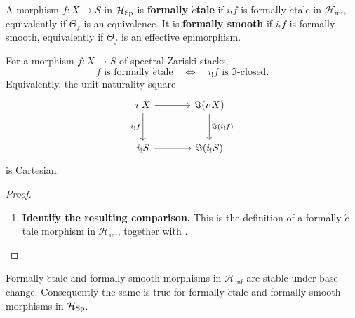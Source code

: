 \begin{definition}
\label{def:formal-smooth-etale}
A morphism \(f:X\to S\) in \(\mathcal H_{\operatorname{Sp}}\) is \textbf{formally
\(\acute{e}\)tale} if \(i_!f\) is formally \(\acute{e}\)tale in
\(\mathcal H_{\inf}\), equivalently if \(\Theta_f\) is an equivalence. It
is \textbf{formally smooth} if \(i_!f\) is formally smooth, equivalently if
\(\Theta_f\) is an effective epimorphism.
\end{definition}

\begin{theorem}
\label{thm:formal-etale-infinitesimal-shape}
For a morphism \(f:X\to S\) of spectral Zariski stacks,
\[
    f\text{ is formally }\acute{e}\text{tale}
    \quad\Longleftrightarrow\quad
    i_!f\text{ is }\Im\text{-closed}.
\]
Equivalently, the unit-naturality square
\[
\begin{tikzcd}[column sep=large,row sep=large]
    i_!X \arrow[r] \arrow[d,"i_!f"']
        & \Im(i_!X) \arrow[d,"\Im(i_!f)"]
    \\
    i_!S \arrow[r]
        & \Im(i_!S)
\end{tikzcd}
\]
is Cartesian.
\end{theorem}

\begin{proof}
\leavevmode
\begin{enumerate}[label=\textup{(\arabic*)}]
    \item \textbf{Identify the resulting comparison.}
    This is the definition of a formally \(\acute{e}\)tale morphism in \(\mathcal H_{\inf}\), together with
    .
\end{enumerate}
\end{proof}

\begin{proposition}
\label{prop:formal-lifting-base-change}
Formally \(\acute{e}\)tale and formally smooth morphisms in
\(\mathcal H_{\inf}\) are stable under base change. Consequently the same is
true for formally \(\acute{e}\)tale and formally smooth morphisms in
\(\mathcal H_{\operatorname{Sp}}\).
\end{proposition}

